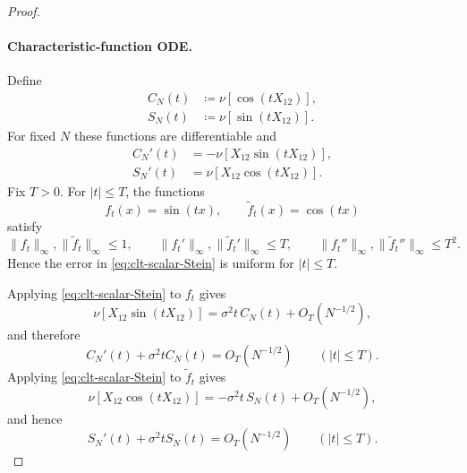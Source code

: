 \begin{proof}
\paragraph{Characteristic-function ODE.}
Define
\begin{align}
 C_N(t)
 &\coloneqq
 \nu[\cos(tX_{12})],
 \label{eq:clt-CN}\\
 S_N(t)
 &\coloneqq
 \nu[\sin(tX_{12})].
 \label{eq:clt-SN}
\end{align}
For fixed $N$ these functions are differentiable and
\begin{align}
 C_N'(t)
 &=
 -\nu[X_{12}\sin(tX_{12})],
 \label{eq:clt-CN-derivative}\\
 S_N'(t)
 &=
 \nu[X_{12}\cos(tX_{12})].
 \label{eq:clt-SN-derivative}
\end{align}
Fix $T>0$.  For $|t|\le T$, the functions
\[
 f_t(x)=\sin(tx),
 \qquad
 \widetilde f_t(x)=\cos(tx)
\]
satisfy
\[
 \|f_t\|_\infty,\|\widetilde f_t\|_\infty\le1,
 \qquad
 \|f_t'\|_\infty,\|\widetilde f_t'\|_\infty\le T,
 \qquad
 \|f_t''\|_\infty,\|\widetilde f_t''\|_\infty\le T^2.
\]
Hence the error in \eqref{eq:clt-scalar-Stein} is uniform for
$|t|\le T$.

Applying \eqref{eq:clt-scalar-Stein} to $f_t$ gives
\[
 \nu[X_{12}\sin(tX_{12})]
 =
 \sigma^2t\,C_N(t)+O_T(N^{-1/2}),
\]
and therefore
\begin{equation}
 C_N'(t)+\sigma^2tC_N(t)
 =
 O_T(N^{-1/2})
 \qquad(|t|\le T).
 \label{eq:clt-C-approx-ODE}
\end{equation}
Applying \eqref{eq:clt-scalar-Stein} to $\widetilde f_t$ gives
\[
 \nu[X_{12}\cos(tX_{12})]
 =
 -\sigma^2t\,S_N(t)+O_T(N^{-1/2}),
\]
and hence
\begin{equation}
 S_N'(t)+\sigma^2tS_N(t)
 =
 O_T(N^{-1/2})
 \qquad(|t|\le T).
 \label{eq:clt-S-approx-ODE}
\end{equation}


\end{proof}
